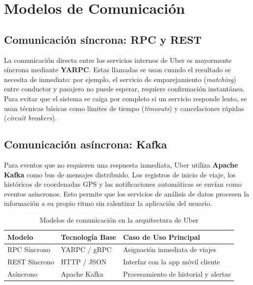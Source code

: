 \documentclass[12pt,a4paper]{article}
\begin{document}
\section{Modelos de Comunicación}

\subsection{Comunicación síncrona: RPC y REST}
La comunicación directa entre los servicios internos de Uber es mayormente síncrona mediante \textbf{YARPC}. Estas llamadas se usan cuando el resultado se necesita de inmediato: por ejemplo, el servicio de emparejamiento (\textit{matching}) entre conductor y pasajero no puede esperar, requiere confirmación instantánea. Para evitar que el sistema se caiga por completo si un servicio responde lento, se usan técnicas básicas como límites de tiempo (\textit{timeouts}) y cancelaciones rápidas (\textit{circuit breakers}).

\subsection{Comunicación asíncrona: Kafka}
Para eventos que no requieren una respuesta inmediata, Uber utiliza \textbf{Apache Kafka} como bus de mensajes distribuido. Los registros de inicio de viaje, los históricos de coordenadas GPS y las notificaciones automáticas se envían como eventos asíncronos. Esto permite que los servicios de análisis de datos procesen la información a su propio ritmo sin ralentizar la aplicación del usuario.

\begin{table}[ht]
  \centering
  \caption{Modelos de comunicación en la arquitectura de Uber}
  \label{tab:comunicacion}
  \small
  \vspace{0.2cm}
  \begin{tabular}{lll}
    \toprule
    \textbf{Modelo} & \textbf{Tecnología Base} & \textbf{Caso de Uso Principal} \\
    \midrule
    RPC Síncrono    & YARPC / gRPC             & Asignación inmediata de viajes \\
    REST Síncrono   & HTTP / JSON              & Interfaz con la app móvil cliente \\
    Asíncrono       & Apache Kafka             & Procesamiento de historial y alertas \\
    \bottomrule
  \end{tabular}
\end{table}
\end{document}
